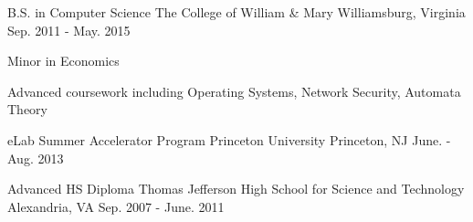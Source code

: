 

\begin{cventries}

  \cventry
    {B.S. in Computer Science} %
    {The College of William \& Mary} %
    {Williamsburg, Virginia} %
    {Sep. 2011 - May. 2015} %
    {
      \begin{cvitems} %
        \item {Minor in Economics}
        \item {Advanced coursework including Operating Systems, Network Security, Automata Theory}
      \end{cvitems}
    }

  \cventry
    {eLab Summer Accelerator Program} %
    {Princeton University} %
    {Princeton, NJ} %
    {June. - Aug. 2013} %
    {}

  \cventry
    {Advanced HS Diploma} %
    {Thomas Jefferson High School for Science and Technology} %
    {Alexandria, VA} %
    {Sep. 2007 - June. 2011} %
    {}
  
\end{cventries}
